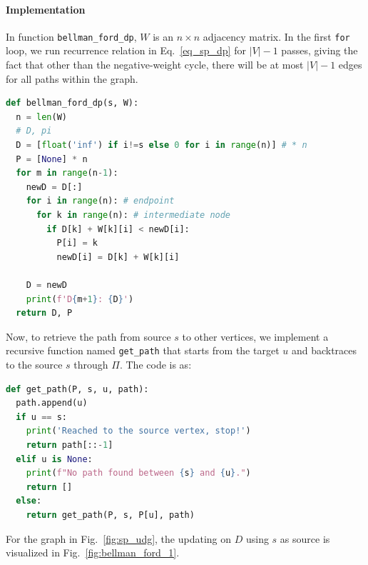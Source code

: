 \documentclass[../main.tex]{subfiles}
\begin{document}
\paragraph{Implementation}  In function \texttt{bellman\_ford\_dp}, $W$ is an $n\times n$ adjacency matrix. In the first \texttt{for} loop, we run recurrence relation in Eq.~\ref{eq_sp_dp} for $|V|-1$ passes, giving the fact that other than the negative-weight cycle, there will be at most $|V|-1$ edges for all paths within the graph.
\begin{lstlisting}[language=Python]
def bellman_ford_dp(s, W):
  n = len(W)
  # D, pi
  D = [float('inf') if i!=s else 0 for i in range(n)] # * n
  P = [None] * n
  for m in range(n-1): 
    newD = D[:]
    for i in range(n): # endpoint
      for k in range(n): # intermediate node
        if D[k] + W[k][i] < newD[i]:
          P[i] = k
          newD[i] = D[k] + W[k][i]

    D = newD
    print(f'D{m+1}: {D}')
  return D, P
\end{lstlisting}
Now, to retrieve the path from source $s$ to other vertices, we implement a recursive function named \texttt{get\_path} that starts from the target $u$ and backtraces to the source $s$ through  $\Pi$. The code is as:
\begin{lstlisting}[language=Python]
def get_path(P, s, u, path):
  path.append(u)
  if u == s:
    print('Reached to the source vertex, stop!')
    return path[::-1]
  elif u is None:
    print(f"No path found between {s} and {u}.")
    return [] 
  else:  
    return get_path(P, s, P[u], path)
\end{lstlisting}
For the graph in Fig.~\ref{fig:sp_udg}, the updating on $D$ using $s$ as source is visualized in Fig.~\ref{fig:bellman_ford_1}. 
\end{document}
